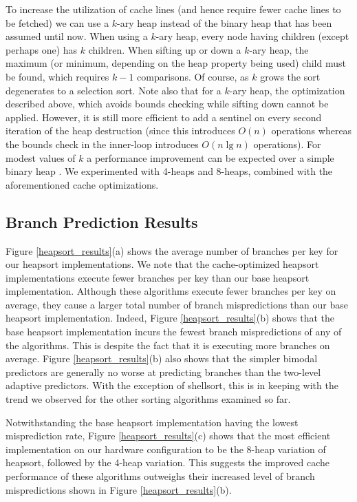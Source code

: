 \documentclass[acmtocl]{acmtrans2m}
\begin{document}
To increase the utilization of cache lines (and hence require fewer cache lines to be
fetched) we can use a $k$-ary heap instead of the binary heap that has been assumed until now. When using a $k$-ary heap, every node having children (except perhaps one)
has $k$ children. When sifting up or down a $k$-ary heap, the maximum (or minimum, depending on the heap property being used) child must be found, which
requires $k - 1$ comparisons. Of course, as $k$ grows the sort degenerates to a selection sort. Note also that for a $k$-ary heap, the optimization described
above, which avoids bounds checking while sifting down cannot be applied. However, it is still more efficient to add a sentinel on every second iteration of the heap 
destruction (since this introduces
$O(n)$ operations whereas the bounds check in the inner-loop introduces $O(n \lg n)$ operations). For modest values of $k$ a performance improvement
can be expected over a simple binary heap \cite{LaMarca96b}. We experimented with 4-heaps and 8-heaps, combined with the aforementioned cache optimizations.

\subsection{Branch Prediction Results}
\label{heapsort_branch_results_text}

Figure \ref{heapsort_results}(a) shows the average number of branches per key for our heapsort implementations. We note that the cache-optimized heapsort
implementations execute fewer branches per key than our base heapsort implementation. Although these algorithms execute fewer branches
per key on average, they cause a larger total number of branch mispredictions than our base heapsort implementation. Indeed, Figure
\ref{heapsort_results}(b) shows that the base heapsort implementation incurs the fewest branch mispredictions of any of the algorithms. 
This is despite the fact that it is executing more branches on average.
Figure \ref{heapsort_results}(b) also shows that the simpler
bimodal predictors are generally no worse at predicting branches than the two-level adaptive predictors. With the exception of shellsort, this is in 
keeping with the trend we observed for 
the other sorting algorithms examined so far.

Notwithstanding the base heapsort implementation having the lowest misprediction rate,
Figure \ref{heapsort_results}(c) shows that the most efficient implementation on our hardware configuration to be the 8-heap variation of heapsort,
followed by the 4-heap variation.
This suggests the improved cache performance of these algorithms outweighs their increased level of branch mispredictions shown in 
Figure \ref{heapsort_results}(b).
\end{document}
